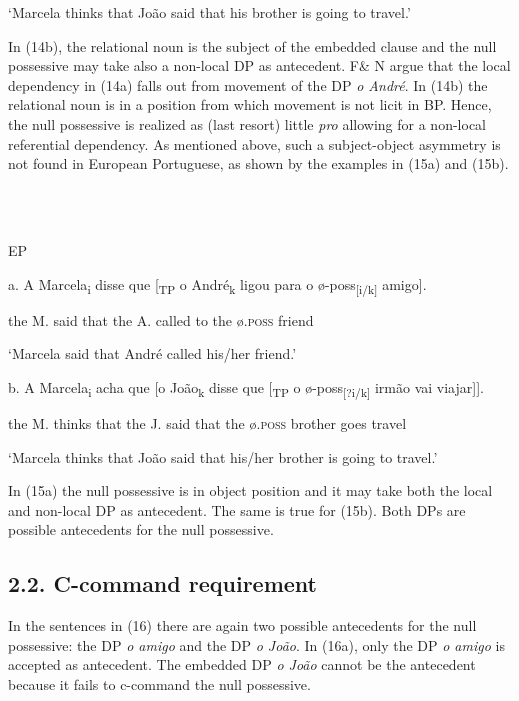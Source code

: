 \documentclass[output=paper]{langsci/langscibook}
\begin{document}
‘Marcela thinks that João said that his brother is going to travel.’

In (14b), the relational noun is the subject of the embedded clause and the null possessive may take also a non-local DP as antecedent. F\& N argue that the local dependency in (14a) falls out from movement of the DP \textit{o André}. In (14b) the relational noun is in a position from which movement is not licit in BP. Hence, the null possessive is realized as (last resort) little \textit{pro} allowing for a non-local referential dependency. As mentioned above, such a subject-object asymmetry is not found in European Portuguese, as shown by the examples in (15a) and (15b).

\ea%
    \label{ex:key:15}
    \gll\\
        \\
    \glt
    \z

          EP

  a.  A Marcela\textsubscript{i} disse que [\textsubscript{TP} o André\textsubscript{k} ligou para o ø-poss\textsubscript{[}\textsubscript{i/k]} amigo].

the M. said that the A. called to the ø\textsc{.poss} friend

‘Marcela said that André called his/her friend.’

  b.  A Marcela\textsubscript{i} acha que [o João\textsubscript{k} disse que [\textsubscript{TP} o ø-poss\textsubscript{[}\textsubscript{?i/k]} irmão vai viajar]].

the M. thinks that the J. said that the ø\textsc{.poss} brother goes travel

‘Marcela thinks that João said that his/her brother is going to travel.’

In (15a) the null possessive is in object position and it may take both the local and non-local DP as antecedent. The same is true for (15b). Both DPs are possible antecedents for the null possessive.

\subsection{ 2.2. C-command requirement}

In the sentences in (16) there are again two possible antecedents for the null possessive: the DP \textit{o amigo} and the DP \textit{o João}. In (16a), only the DP \textit{o amigo} is accepted as antecedent. The embedded DP \textit{o João} cannot be the antecedent because it fails to c-command the null possessive.
\end{document}
